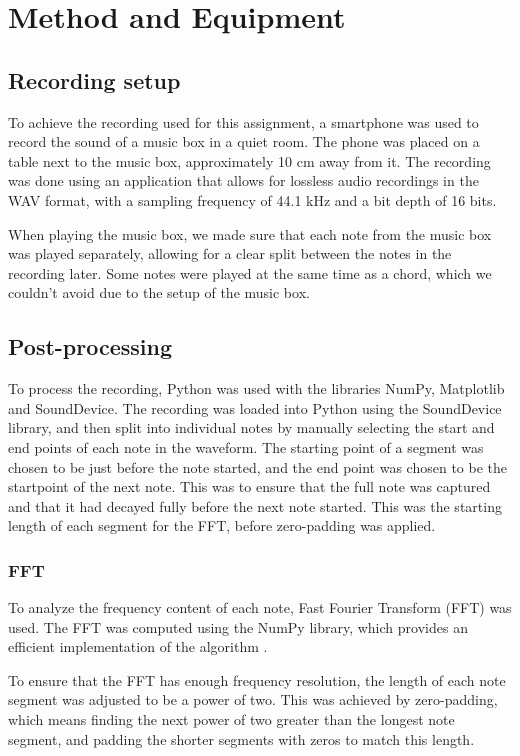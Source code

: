 \chapter{Method and Equipment}

\section{Recording setup}

To achieve the recording used for this assignment, a smartphone was used to record the sound of a music box in a quiet room. The phone was placed on a table next to the music box, approximately 10 cm away from it. The recording was done using an application that allows for lossless audio recordings in the WAV format, with a sampling frequency of 44.1 kHz and a bit depth of 16 bits.

When playing the music box, we made sure that each note from the music box was played separately, allowing for a clear split between the notes in the recording later. Some notes were played at the same time as a chord, which we couldn't avoid due to the setup of the music box.

\section{Post-processing}

To process the recording, Python was used with the libraries NumPy, Matplotlib and SoundDevice. The recording was loaded into Python using the SoundDevice library, and then split into individual notes by manually selecting the start and end points of each note in the waveform. The starting point of a segment was chosen to be just before the note started, and the end point was chosen to be the startpoint of the next note. This was to ensure that the full note was captured and that it had decayed fully before the next note started. This was the starting length of each segment for the FFT, before zero-padding was applied.

\subsection{FFT}

To analyze the frequency content of each note, Fast Fourier Transform (FFT) was used. The FFT was computed using the NumPy library, which provides an efficient implementation of the algorithm \cite{NumPyFFT}.

To ensure that the FFT has enough frequency resolution, the length of each note segment was adjusted to be a power of two. This was achieved by zero-padding, which means finding the next power of two greater than the longest note segment, and padding the shorter segments with zeros to match this length. 

